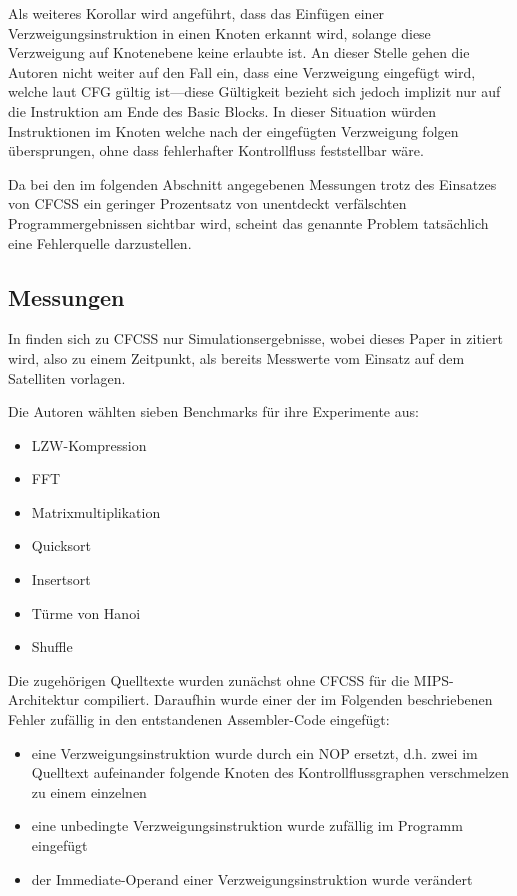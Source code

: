 \documentclass[11pt]{article}
\begin{document}
Als weiteres Korollar wird angeführt, dass das Einfügen einer
Verzweigungsinstruktion in einen Knoten erkannt wird, solange diese Verzweigung
auf Knotenebene keine erlaubte ist. An dieser Stelle gehen die Autoren nicht
weiter auf den Fall ein, dass eine Verzweigung eingefügt wird, welche laut CFG
gültig ist—diese Gültigkeit bezieht sich jedoch implizit nur auf die
Instruktion am Ende des Basic Blocks. In dieser Situation würden Instruktionen
im Knoten welche nach der eingefügten Verzweigung folgen übersprungen, ohne
dass fehlerhafter Kontrollfluss feststellbar wäre.

Da bei den im folgenden Abschnitt angegebenen Messungen trotz des Einsatzes von
CFCSS ein geringer Prozentsatz von unentdeckt verfälschten Programmergebnissen
sichtbar wird, scheint das genannte Problem tatsächlich eine Fehlerquelle
darzustellen.

\subsection{Messungen}

In \cite{oh-2002-control} finden sich zu CFCSS nur Simulationsergebnisse, wobei
dieses Paper in \cite{argos-2002-lessons} zitiert wird, also zu einem
Zeitpunkt, als bereits Messwerte vom Einsatz auf dem Satelliten vorlagen.

Die Autoren wählten sieben Benchmarks für ihre Experimente aus:

\begin{itemize}
  \item LZW-Kompression
  \item FFT
  \item Matrixmultiplikation
  \item Quicksort
  \item Insertsort
  \item Türme von Hanoi
  \item Shuffle
\end{itemize}

Die zugehörigen Quelltexte wurden zunächst ohne CFCSS für die MIPS-Architektur
compiliert. Daraufhin wurde einer der im Folgenden beschriebenen Fehler
zufällig in den entstandenen Assembler-Code eingefügt:

\begin{itemize}
  \item eine Verzweigungsinstruktion wurde durch ein NOP ersetzt,
        d.h. zwei im Quelltext aufeinander folgende Knoten des Kontrollflussgraphen
        verschmelzen zu einem einzelnen
  \item eine unbedingte Verzweigungsinstruktion wurde zufällig im Programm eingefügt
  \item der Immediate-Operand einer Verzweigungsinstruktion wurde verändert
\end{itemize}
\end{document}
